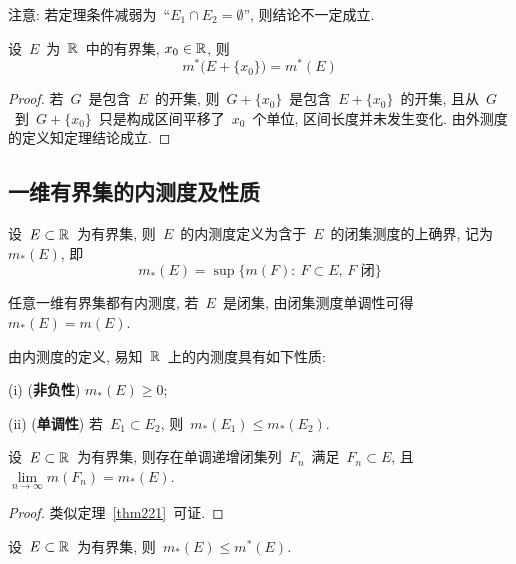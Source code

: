 注意: 若定理条件减弱为~``$E_1 \cap E_2 = \emptyset$'', 则结论不一定成立.

\begin{theorem}
设~$E$~为~$\mathbb{R}$~中的有界集, $x_0 \in \mathbb{R}$, 则
\[
m^*\big(E + \{x_0\} \big) = m^*(E)
\]
\end{theorem}

\begin{proof}
若~$G$~是包含~$E$~的开集, 则~$G + \{x_0\}$~是包含~$E + \{x_0\}$~的开集,
且从~$G$~到~$G + \{x_0\}$~只是构成区间平移了~$x_0$~个单位, 区间长度并未发生变化.
由外测度的定义知定理结论成立.
\end{proof}

\subsection{一维有界集的内测度及性质}

\begin{definition}
设~$E \subset \mathbb{R}$~为有界集, 则~$E$~的内测度定义为含于~$E$~的闭集测度的上确界,
记为~$m_*(E)$, 即
\[
m_*(E) = \sup \big\{m(F): \: F \subset E,\, F \mbox{~闭}\big\}
\]
\end{definition}

\begin{remark} \label{rem233}
任意一维有界集都有内测度, 若~$E$~是闭集, 由闭集测度单调性可得~$m_*(E) = m(E)$.
\end{remark}

\begin{proposition}
由内测度的定义, 易知~$\mathbb{R}$~上的内测度具有如下性质:

(i) (\textbf{非负性}) $m_*(E) \geqslant 0$;

(ii) (\textbf{单调性}) 若~$E_1 \subset E_2$, 则~$m_*(E_1) \leqslant m_*(E_2)$.
\end{proposition}

\begin{theorem}
设~$E \subset \mathbb{R}$~为有界集, 则存在单调递增闭集列~$F_n$~满足~$F_n \subset E$,
且~$\lim\limits_{n \to \infty} m(F_n) = m_*(E)$.
\end{theorem}

\begin{proof}
类似定理~\ref{thm221}~可证.
\end{proof}

\begin{proposition}
设~$E \subset \mathbb{R}$~为有界集, 则~$m_*(E) \leqslant m^*(E)$.
\end{proposition}


